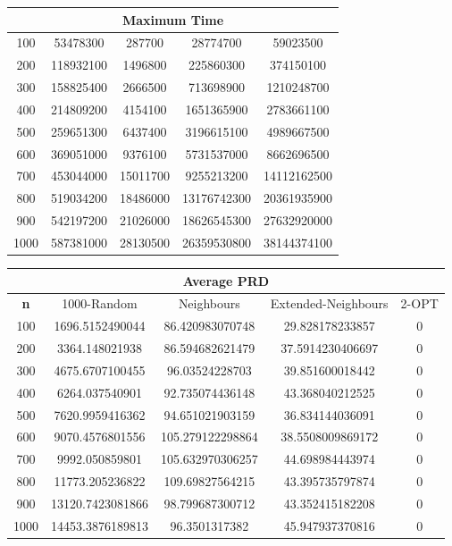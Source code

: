\documentclass{article}
\begin{document}
\begin{center}
\begin{tabular}{|c|c|c|c|c|}
\hline
\multicolumn{5}{|c|}{\textbf{Maximum Time}}\\
\hline
100 & 53478300 & 287700 & 28774700 & 59023500\\
\hline
200 & 118932100 & 1496800 & 225860300 & 374150100\\
\hline
300 & 158825400 & 2666500 & 713698900 & 1210248700\\
\hline
400 & 214809200 & 4154100 & 1651365900 & 2783661100\\
\hline
500 & 259651300 & 6437400 & 3196615100 & 4989667500\\
\hline
600 & 369051000 & 9376100 & 5731537000 & 8662696500\\
\hline
700 & 453044000 & 15011700 & 9255213200 & 14112162500\\
\hline
800 & 519034200 & 18486000 & 13176742300 & 20361935900\\
\hline
900 & 542197200 & 21026000 & 18626545300 & 27632920000\\
\hline
1000 & 587381000 & 28130500 & 26359530800 & 38144374100\\
\hline
\end{tabular}
\end{center}

\begin{center}
\begin{tabular}{|c|c|c|c|c|}
\hline
\multicolumn{5}{|c|}{\textbf{Average PRD}}\\
\hline
\textbf{n} & 1000-Random & Neighbours & Extended-Neighbours & 2-OPT\\
\hline
100 & 1696.5152490044 & 86.420983070748 & 29.828178233857 & 0\\
\hline
200 & 3364.148021938 & 86.594682621479 & 37.5914230406697 & 0\\
\hline
300 & 4675.6707100455 & 96.03524228703 & 39.851600018442 & 0\\
\hline
400 & 6264.037540901 & 92.735074436148 & 43.368040212525 & 0\\
\hline
500 & 7620.9959416362 & 94.651021903159 & 36.834144036091 & 0\\
\hline
600 & 9070.4576801556 & 105.279122298864 & 38.5508009869172 & 0\\
\hline
700 & 9992.050859801 & 105.632970306257 & 44.698984443974 & 0\\
\hline
800 & 11773.205236822 & 109.69827564215 & 43.395735797874 & 0\\
\hline
900 & 13120.7423081866 & 98.799687300712 & 43.352415182208 & 0\\
\hline
1000 & 14453.3876189813 & 96.3501317382 & 45.947937370816 & 0\\
\hline
\end{tabular}
\end{center}
\end{document}
